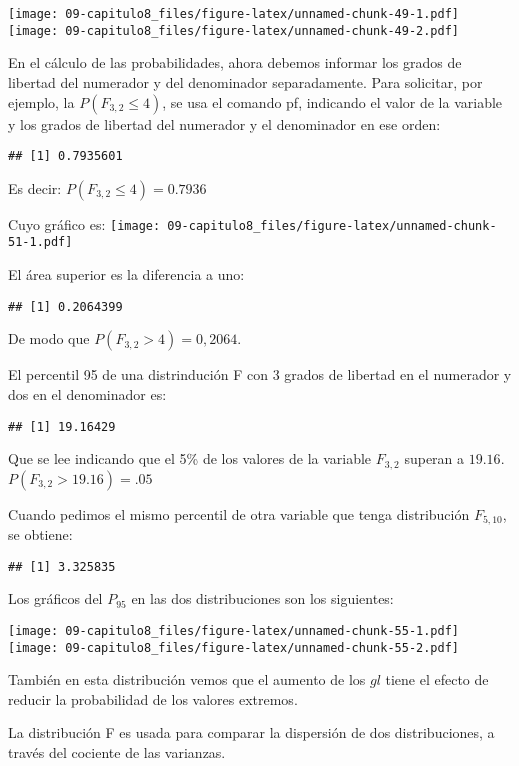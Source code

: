\documentclass[]{article}
\begin{document}
\texttt{[image: 09-capitulo8\_files/figure-latex/unnamed-chunk-49-1.pdf]}
\texttt{[image: 09-capitulo8\_files/figure-latex/unnamed-chunk-49-2.pdf]}

En el cálculo de las probabilidades, ahora debemos informar los grados
de libertad del numerador y del denominador separadamente. Para
solicitar, por ejemplo, la \(P(F_{3,2} \leq 4)\), se usa el comando pf,
indicando el valor de la variable y los grados de libertad del numerador
y el denominador en ese orden:

\begin{verbatim}
## [1] 0.7935601
\end{verbatim}

Es decir: \(P(F_{3,2} \leq 4)=0.7936\)

Cuyo gráfico es:
\texttt{[image: 09-capitulo8\_files/figure-latex/unnamed-chunk-51-1.pdf]}

El área superior es la diferencia a uno:

\begin{verbatim}
## [1] 0.2064399
\end{verbatim}

De modo que \(P(F_{3,2} > 4) = 0,2064\).

El percentil 95 de una distrindución F con 3 grados de libertad en el
numerador y dos en el denominador es:

\begin{verbatim}
## [1] 19.16429
\end{verbatim}

Que se lee indicando que el 5\% de los valores de la variable
\(F_{3,2}\) superan a \(19.16\). \(P(F_{3,2}>19.16)=.05\)

Cuando pedimos el mismo percentil de otra variable que tenga
distribución \(F_{5,10}\), se obtiene:

\begin{verbatim}
## [1] 3.325835
\end{verbatim}

Los gráficos del \(P_{95}\) en las dos distribuciones son los
siguientes:

\texttt{[image: 09-capitulo8\_files/figure-latex/unnamed-chunk-55-1.pdf]}
\texttt{[image: 09-capitulo8\_files/figure-latex/unnamed-chunk-55-2.pdf]}

También en esta distribución vemos que el aumento de los \(gl\) tiene el
efecto de reducir la probabilidad de los valores extremos.

La distribución F es usada para comparar la dispersión de dos
distribuciones, a través del cociente de las varianzas.
\end{document}
